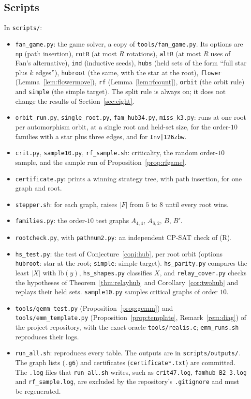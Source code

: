 \documentclass[11pt]{amsart}
\theoremstyle{definition}
\begin{document}
\subsection*{Scripts} In \texttt{scripts/}:
\begin{itemize}
\item \texttt{fan\_game.py}: the game solver, a copy of \texttt{tools/fan\_game.py}. Its options
are \texttt{np} (path insertion), \texttt{rotR} (at most $R$ rotations), \texttt{altR} (at most $R$
uses of Fan's alternative), \texttt{ind} (inductive seeds), \texttt{hubs} (held sets of the
form ``full star plus $k$ edges''), \texttt{hubroot} (the same, with the star at the root),
\texttt{flower} (Lemma~\ref{lem:flowermove}), \texttt{rf} (Lemma~\ref{lem:rfcount}), \texttt{orbit} (the
orbit rule) and \texttt{simple} (the simple target). The split rule is always on; it
does not change the results of Section~\ref{sec:eight}.
\item \texttt{orbit\_run.py}, \texttt{single\_root.py}, \texttt{fam\_hub34.py},
\texttt{miss\_k3.py}: runs at one root per automorphism orbit, at a single root and held-set size,
for the order-$10$ families with a star plus three edges, and for \texttt{Inv|\char126zbw}.
\item \texttt{crit.py}, \texttt{sample10.py}, \texttt{rf\_sample.sh}: criticality, the random
order-$10$ sample, and the sample run of Proposition~\ref{prop:rfgame}.
\item \texttt{certificate.py}: prints a winning strategy tree, with path insertion, for one graph and
root.
\item \texttt{stepper.sh}: for each graph, raises $|F|$ from $5$ to $8$ until every root wins.
\item \texttt{families.py}: the order-$10$ test graphs $A_{4,4}$, $A_{6,2}$, $B$, $B'$.
\item \texttt{rootcheck.py}, with \texttt{pathnum2.py}: an independent CP-SAT check of (R).
\item \texttt{hs\_test.py}: the test of Conjecture~\ref{conj:hub}, per root orbit (options
\texttt{hubroot}: star at the root; \texttt{simple}: simple target). \texttt{hs\_parity.py} compares
the least $|X|$ with $\mathrm{lb}(y)$, \texttt{hs\_shapes.py} classifies $X$, and
\texttt{relay\_cover.py} checks the hypotheses of Theorem~\ref{thm:relayhub} and
Corollary~\ref{cor:twohub} and replays their held sets. \texttt{sample10.py} samples critical
graphs of order $10$.
\item \texttt{tools/gemm\_test.py} (Proposition~\ref{prop:gemm}) and \texttt{tools/emm\_template.py}
(Proposition~\ref{prop:template}, Remark~\ref{rem:diag}) of the project repository, with the exact
oracle \texttt{tools/realis.c}; \texttt{emm\_runs.sh} reproduces their logs.
\item \texttt{run\_all.sh}: reproduces every table. The outputs are in \texttt{scripts/outputs/}.
The graph lists (\texttt{.g6}) and certificates (\texttt{certificate*.txt}) are committed. The
\texttt{.log} files that \texttt{run\_all.sh} writes, such as \texttt{crit47.log},
\texttt{famhub\_B2\_3.log} and \texttt{rf\_sample.log}, are excluded by the repository's
\texttt{.gitignore} and must be regenerated.
\end{itemize}
\end{document}
